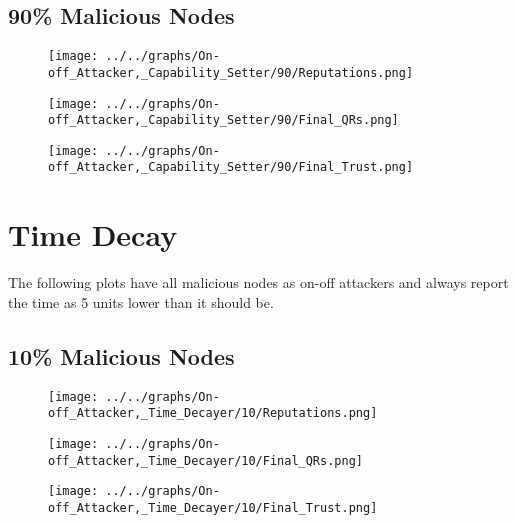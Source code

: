 \begin{minipage}[t]{0.49\columnwidth}
\subsection*{90\% Malicious Nodes}
    \begin{figure}[H]
        \centering
        \texttt{[image: ../../graphs/On-off\_Attacker,\_Capability\_Setter/90/Reputations.png]}
    \end{figure}
    \begin{figure}[H]
        \centering
        \texttt{[image: ../../graphs/On-off\_Attacker,\_Capability\_Setter/90/Final\_QRs.png]}
    \end{figure}
\end{minipage}
\begin{minipage}[t]{0.49\columnwidth}
    \begin{figure}[H]
        \centering
        \texttt{[image: ../../graphs/On-off\_Attacker,\_Capability\_Setter/90/Final\_Trust.png]}
    \end{figure}
\end{minipage}
\newpage

\section*{Time Decay}
The following plots have all malicious nodes as on-off attackers and always
report the time as 5 units lower than it should be.
\\
\begin{minipage}[t]{0.49\columnwidth}
\subsection*{10\% Malicious Nodes}
    \begin{figure}[H]
        \centering
        \texttt{[image: ../../graphs/On-off\_Attacker,\_Time\_Decayer/10/Reputations.png]}
    \end{figure}
    \begin{figure}[H]
        \centering
        \texttt{[image: ../../graphs/On-off\_Attacker,\_Time\_Decayer/10/Final\_QRs.png]}
    \end{figure}
\end{minipage}
\begin{minipage}[t]{0.49\columnwidth}
    \begin{figure}[H]
        \centering
        \texttt{[image: ../../graphs/On-off\_Attacker,\_Time\_Decayer/10/Final\_Trust.png]}
    \end{figure}
\end{minipage}

